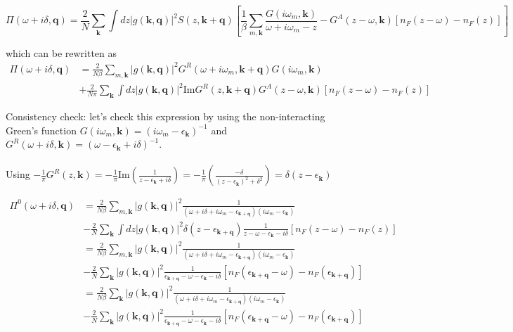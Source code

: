\documentclass[]{article}
\newcommand{\kk}{\mathbf{k}}
\newcommand{\qq}{\mathbf{q}}
\newcommand{\iwm}{i\omega_m}
\newcommand{\gs}{\left| g(\mathbf{k}, \mathbf{q}) \right|^2}
\begin{document}
\begin{equation}
\boxed{
\Pi(\omega+i\delta, \qq) = \frac{2}{N} \sum_\kk \int dz \gs S(z, \kk+\qq)\left[ \frac{1}{\beta} \sum_{m,\kk}  \frac{G(\iwm,\kk)}{\omega+\iwm-z} - G^{A}(z-\omega,\kk)\left[n_F(z-\omega) - n_F(z)\right] \right]}
\end{equation}



which can be rewritten as
\begin{equation}
\begin{split}
\Pi(\omega+i\delta, \qq) &= \frac{2}{N \beta} \sum_{m,\kk} \gs G^R(\omega+\iwm, \kk+\qq) G(\iwm,\kk) \\
& + \frac{2}{N\pi} \sum_\kk \int dz \gs \mathrm{Im}G^R(z, \kk+\qq) G^{A}(z-\omega,\kk)\left[n_F(z-\omega) - n_F(z)\right]
\end{split}
\end{equation}
 
Consistency check: let's check this expression by using the non-interacting Green's function $G(\iwm,\kk) = (\iwm - \epsilon_\kk)^{-1}$ and $G^R(\omega+i\delta, \kk) = (\omega-\epsilon_\kk + i\delta)^{-1}$.
\\
\\
Using $-\frac{1}{\pi}G^R(z,\kk) = -\frac{1}{\pi}\mathrm{Im} \left( \frac{1}{z-\epsilon_\kk+i\delta} \right) = -\frac{1}{\pi}\left( \frac{-\delta}{(z-\epsilon_\kk)^2+\delta^2} \right) = \delta(z-\epsilon_\kk)$ 

\begin{equation}
\begin{split}
\Pi^0(\omega+i\delta, \qq) &= \frac{2}{N \beta} \sum_{m,\kk} \gs \frac{1}{(\omega+i\delta+\iwm - \epsilon_{\kk+\qq})(\iwm-\epsilon_\kk)} \\
& - \frac{2}{N} \sum_\kk \int dz \gs \delta(z-\epsilon_{\kk+\qq})\frac{1}{z-\omega-\epsilon_\kk-i\delta} \left[n_F(z-\omega) - n_F(z)\right] \\
& = \frac{2}{N \beta} \sum_{m,\kk} \gs \frac{1}{(\omega+i\delta+\iwm - \epsilon_{\kk+\qq})(\iwm-\epsilon_\kk)} \\
& - \frac{2}{N} \sum_\kk \gs \frac{1}{\epsilon_{\kk+\qq}-\omega-\epsilon_\kk-i\delta} \left[n_F(\epsilon_{\kk+\qq}-\omega) - n_F(\epsilon_{\kk+\qq})\right] \\
& = \frac{2}{N \beta} \sum_\kk \gs \frac{1}{(\omega+i\delta+\iwm - \epsilon_{\kk+\qq})(\iwm-\epsilon_\kk)} \\
& - \frac{2}{N} \sum_\kk \gs \frac{1}{\epsilon_{\kk+\qq}-\omega-\epsilon_\kk-i\delta} \left[n_F(\epsilon_{\kk+\qq}-\omega) - n_F(\epsilon_{\kk+\qq})\right]
\end{split}
\end{equation}
\end{document}
